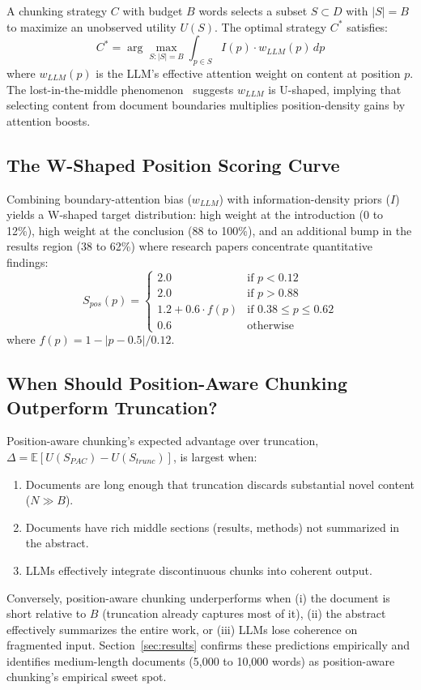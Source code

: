 \documentclass{ieeeaccess}
\begin{document}
A chunking strategy $C$ with budget $B$ words selects a subset $S \subset D$ with $|S| = B$ to maximize an unobserved utility $U(S)$. The optimal strategy $C^*$ satisfies:
\begin{equation}
C^* = \arg\max_{S : |S| = B} \int_{p \in S} I(p) \cdot w_{LLM}(p)\, dp
\label{eq:optimal}
\end{equation}
where $w_{LLM}(p)$ is the LLM's effective attention weight on content at position $p$. The lost-in-the-middle phenomenon~\cite{b1} suggests $w_{LLM}$ is U-shaped, implying that selecting content from document boundaries multiplies position-density gains by attention boosts.

\subsection{The W-Shaped Position Scoring Curve}

Combining boundary-attention bias ($w_{LLM}$) with information-density priors ($I$) yields a W-shaped target distribution: high weight at the introduction (0 to 12\%), high weight at the conclusion (88 to 100\%), and an additional bump in the results region (38 to 62\%) where research papers concentrate quantitative findings:
\begin{equation}
S_{pos}(p) = \begin{cases}
2.0 & \text{if } p < 0.12 \\
2.0 & \text{if } p > 0.88 \\
1.2 + 0.6 \cdot f(p) & \text{if } 0.38 \leq p \leq 0.62 \\
0.6 & \text{otherwise}
\end{cases}
\label{eq:wcurve}
\end{equation}
where $f(p) = 1 - |p - 0.5|/0.12$.

\subsection{When Should Position-Aware Chunking Outperform Truncation?}

Position-aware chunking's expected advantage over truncation, $\Delta = \mathbb{E}[U(S_{PAC}) - U(S_{trunc})]$, is largest when:
\begin{enumerate}
    \item Documents are long enough that truncation discards substantial novel content ($N \gg B$).
    \item Documents have rich middle sections (results, methods) not summarized in the abstract.
    \item LLMs effectively integrate discontinuous chunks into coherent output.
\end{enumerate}
Conversely, position-aware chunking underperforms when (i) the document is short relative to $B$ (truncation already captures most of it), (ii) the abstract effectively summarizes the entire work, or (iii) LLMs lose coherence on fragmented input. Section~\ref{sec:results} confirms these predictions empirically and identifies medium-length documents (5,000 to 10,000 words) as position-aware chunking's empirical sweet spot.
\end{document}
